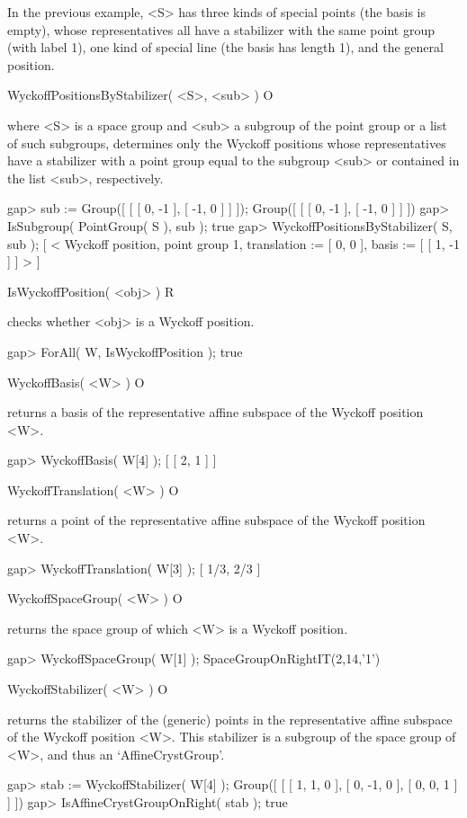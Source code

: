 In the previous example, <S> has three kinds of special points
(the basis is empty), whose representatives all have a stabilizer 
with the same point group (with label 1), one kind of special line
(the basis has length 1), and the general position.

\>WyckoffPositionsByStabilizer( <S>, <sub> ) O

where <S> is a space group and <sub> a subgroup of the point group or
a list of such subgroups, determines only the Wyckoff positions whose
representatives have a stabilizer with a point group equal to the 
subgroup <sub> or contained in the list <sub>, respectively.

\beginexample
gap> sub := Group([ [ [ 0, -1 ], [ -1, 0 ] ] ]);
Group([ [ [ 0, -1 ], [ -1, 0 ] ] ])
gap> IsSubgroup( PointGroup( S ), sub );
true
gap> WyckoffPositionsByStabilizer( S, sub );
[ < Wyckoff position, point group 1, translation := [ 0, 0 ], 
    basis := [ [ 1, -1 ] ] >
     ]
\endexample

\>IsWyckoffPosition( <obj> ) R

checks whether <obj> is a Wyckoff position.

\beginexample
gap> ForAll( W, IsWyckoffPosition );
true
\endexample

\>WyckoffBasis( <W> ) O

returns a basis of the representative affine subspace of the Wyckoff 
position <W>.

\beginexample
gap> WyckoffBasis( W[4] );
[ [ 2, 1 ] ]
\endexample

\>WyckoffTranslation( <W> ) O

returns a point of the representative affine subspace of the Wyckoff 
position <W>.

\beginexample
gap> WyckoffTranslation( W[3] );
[ 1/3, 2/3 ]
\endexample

\>WyckoffSpaceGroup( <W> ) O

returns the space group of which <W> is a Wyckoff position.

\beginexample
gap> WyckoffSpaceGroup( W[1] );
SpaceGroupOnRightIT(2,14,'1')
\endexample

\>WyckoffStabilizer( <W> ) O

returns the stabilizer of the (generic) points in the representative
affine subspace of the Wyckoff position <W>. This stabilizer is a
subgroup of the space group of <W>, and thus an `AffineCrystGroup'.

\beginexample
gap> stab := WyckoffStabilizer( W[4] );
Group([ [ [ 1, 1, 0 ], [ 0, -1, 0 ], [ 0, 0, 1 ] ] ])
gap> IsAffineCrystGroupOnRight( stab );
true
\endexample

